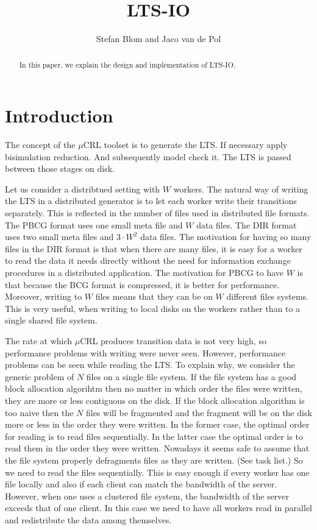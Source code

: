 \documentclass{article}
\title{LTS-IO}
\author{Stefan Blom and Jaco van de Pol}
\begin{document}
\begin{abstract}
In this paper, we explain the design and implementation of LTS-IO.
\end{abstract}

\section{Introduction}

The concept of the $\mu$CRL toolset is to generate the LTS.
If necessary apply bisimulation reduction. And subsequently
model check it. The LTS is passed between those stages on disk.


Let us consider a distribtued setting with $W$ workers.
The natural way of writing the LTS in a distributed generator is to let each worker
write their transitions separately. This is reflected in the number of files used in
distributed file formats. The PBCG format uses one small meta file and $W$ data files.
The DIR format uses two small meta files and $3\cdot W^2$ data files.
The motivation for having so many files in the DIR format is that when there are many files,
it is easy for a worker to read the data it needs directly without the need for
information exchange procedures in a distributed application. The motivation for
PBCG to have $W$ is that because the BCG format is compressed, it is better for performance.
Moreover, writing to $W$ files means that they can be on $W$ different files systems.
This is very useful, when writing to local disks on the workers rather than to
a single shared file system.

The rate at which $\mu$CRL produces transition data is not very high,
so performance problems with writing were never seen. However, performance problems
can be seen while reading the LTS. To explain why, we consider the generic problem
of $N$ files on a single file system. If the file system has a good block
allocation algorihtm then no matter in which order the files were written,
they are more or less contiguous on the disk. If the block allocation algorithm is
too naive then the $N$ files will be fragmented and the fragment will be on
the disk more or less in the order they were written. In the former case, the optimal order
for reading is to read files sequentially. In the latter case the optimal order is
to read them in the order they were written. Nowadays it seems safe to assume that
the file system properly defragments files as they are written. (See task list.)
So we need to read the files sequentially. This is easy enough if every worker has one file locally
and also if each client can match the bandwidth of the server. However, when one uses
a clustered file system, the bandwidth of the server exceeds that of one client.
In this case we need to have all workers read in parallel and redistribute the data
among themselves.
\end{document}
